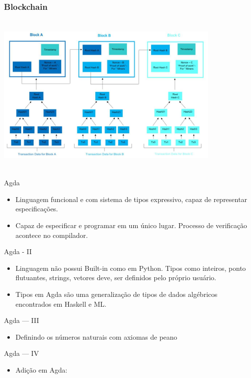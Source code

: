\documentclass{beamer}
\begin{document}
\begin{frame}
\frametitle{Blockchain}
\includegraphics[width=11cm, height=8cm]{blockchain3}
\end{frame}
 
 \begin{frame}{Agda}
 \begin{itemize}
     \item Linguagem funcional e com sistema de tipos expressivo, capaz de representar especificações.
     \item Capaz de especificar e programar em um único lugar. Processo de verificação acontece no compilador.
 \end{itemize}
 \end{frame}
 
 \begin{frame}{Agda - II}
 \begin{itemize}
     \item Linguagem não possui Built-in como em Python. Tipos como inteiros, ponto flutuantes, strings, vetores deve, ser definidos pelo próprio usuário.
     \item Tipos em Agda são uma generalização de tipos de dados algébricos encontrados em Haskell e ML.
 \end{itemize}
 \end{frame}
 
 \begin{frame}{Agda --- III}
\begin{itemize}
	\item Definindo os números naturais com axiomas de peano
 \end{itemize}
\end{frame}

       \begin{frame}{Agda --- IV}
         \begin{itemize}
           \item Adição em Agda:
         \end{itemize}
\end{frame}
\end{document}
